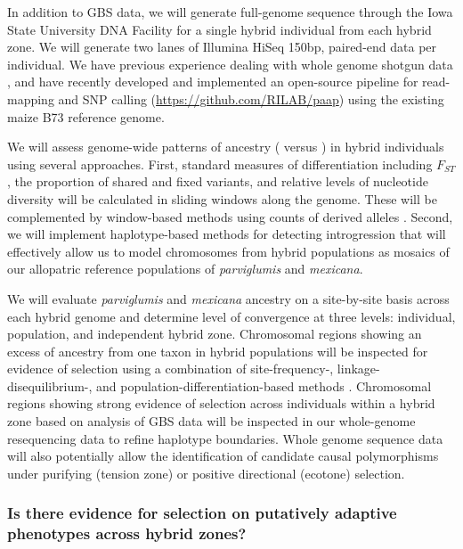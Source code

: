 In addition to GBS data, we will generate full-genome sequence through the Iowa State University DNA Facility for a single hybrid individual from each hybrid zone.  We will generate two lanes of Illumina HiSeq 150bp, paired-end data per individual. 
We have previous experience dealing with whole genome shotgun data \citep{Gore2009, Chia2012a,  Hufford2012b, da2015origin}, and have recently developed and implemented an open-source pipeline for read-mapping and SNP calling (\url{https://github.com/RILAB/paap}) using the existing maize B73 reference genome. 
 
We will assess genome-wide patterns of ancestry (\zp{} versus \zm{}) in hybrid individuals using several approaches.  
First, standard measures of differentiation including $F_{ST}$, the proportion of shared and fixed variants, and relative levels of nucleotide diversity \citep{Geneva2014} will be calculated in sliding windows along the genome. 
These will be complemented by window-based methods using counts of derived alleles \citep{martin2015evaluating}.
Second, we will implement haplotype-based methods for detecting introgression \citep[\emph{e.g.},][]{price2009, lawson2012} that will effectively allow us to model chromosomes from hybrid populations as mosaics of our allopatric reference populations of \emph{parviglumis} and \emph{mexicana}.  

We will evaluate \emph{parviglumis} and \emph{mexicana} ancestry on a site-by-site basis across each hybrid genome and determine level of convergence at three levels: individual, population, and independent hybrid zone.  
Chromosomal regions showing an excess of ancestry from one taxon in hybrid populations will be inspected for evidence of selection using a combination of site-frequency-, linkage-disequilibrium-, and population-differentiation-based methods \citep[reviewed in][]{Vitti2013}.
Chromosomal regions showing strong evidence of selection across individuals within a hybrid zone based on analysis of GBS data will be inspected in our whole-genome resequencing data to refine haplotype boundaries. 
Whole genome sequence data will also potentially allow the identification of candidate causal polymorphisms under purifying (tension zone) or positive directional (ecotone) selection.



\subsubsection{Is there evidence for selection on putatively adaptive phenotypes across hybrid zones?}
\label{sss:driftsel}

